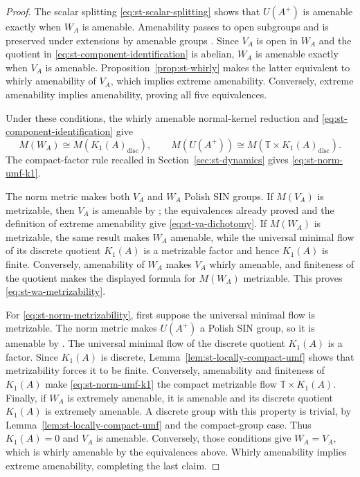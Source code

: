 \begin{proof}
The scalar splitting \eqref{eq:st-scalar-splitting} shows that $U(A^+)$ is amenable
exactly when $W_A$ is amenable. Amenability passes to open subgroups and is
preserved under extensions by amenable groups \cite[Theorem~2.8]{AlekseevSchmidtThom2025}. Since 
$V_A$ is open in $W_A$ and the quotient in \eqref{eq:st-component-identification} is
abelian, $W_A$ is amenable exactly when $V_A$ is amenable. Proposition~\ref{prop:st-whirly} makes the latter equivalent to whirly amenability of $V_A$,
which implies extreme amenability. Conversely, extreme amenability implies
amenability, proving all five equivalences.

Under these conditions, the whirly amenable normal-kernel reduction and \eqref{eq:st-component-identification} give 
\begin{equation*}
M(W_A)\cong M(K_1(A)_{\mathrm{disc}}),  \qquad  M(U(A^+))\cong M(\mathbb{T}\times K_1(A)_{\mathrm{disc}}). 
\end{equation*}
The compact-factor rule recalled in Section~\ref{sec:st-dynamics} gives \eqref{eq:st-norm-umf-k1}.

The norm metric makes both $V_A$ and $W_A$ Polish SIN groups. If $M(V_A)$ is
metrizable, then $V_A$ is amenable by \cite[Corollary 3.4]{BYMT2017}; the
equivalences already proved and the definition of extreme amenability give \eqref{eq:st-va-dichotomy}. If $M(W_A)$ is metrizable, the same result makes $W_A$ amenable, while the universal minimal flow of its discrete quotient $K_1(A)$ is a metrizable factor and hence $K_1(A)$ is finite. Conversely,
amenability of $W_A$ makes $V_A$ whirly amenable, and finiteness of the
quotient makes the displayed formula for $M(W_A)$ metrizable. This proves \eqref{eq:st-wa-metrizability}.

For \eqref{eq:st-norm-metrizability}, first suppose the universal minimal flow
is metrizable. The norm metric makes $U(A^+)$ a Polish SIN group, so it is
amenable by \cite[Corollary 3.4]{BYMT2017}. The universal minimal flow of the
discrete quotient $K_1(A)$ is a factor. Since $K_1(A)$ is discrete, Lemma~\ref{lem:st-locally-compact-umf} shows that metrizability forces it to be
finite. Conversely, amenability and finiteness of $K_1(A)$ make \eqref{eq:st-norm-umf-k1} the compact metrizable flow $\mathbb{T}\times K_1(A)$.
Finally, if $W_A$ is extremely amenable, it is amenable and its discrete
quotient $K_1(A)$ is extremely amenable. A discrete group with this property
is trivial, by Lemma~\ref{lem:st-locally-compact-umf} and the compact-group
case. Thus $K_1(A)=0$ and $V_A$ is amenable. Conversely, those conditions
give $W_A=V_A$, which is whirly amenable by the equivalences above.
Whirly amenability implies extreme amenability, completing the last claim.
\end{proof}

